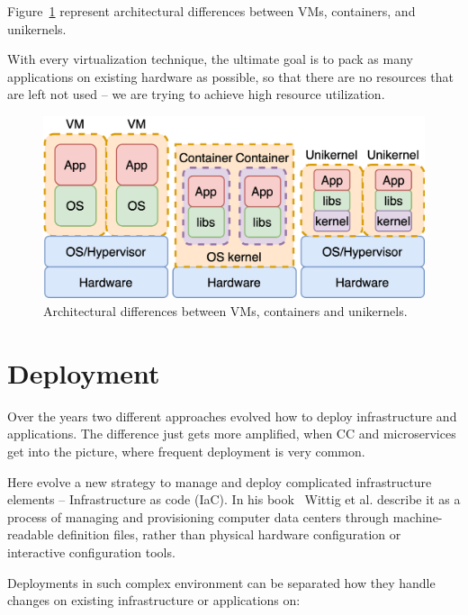 Figure~\ref{fig:fig5} represent architectural differences between VMs, containers, and unikernels.

With every virtualization technique, the ultimate goal is to pack as many applications on existing hardware as possible, so that there are no resources that are left not used -- we are trying to achieve high resource utilization.

\begin{figure}[H]
	\begin{center}
		\includegraphics[scale=0.9]{images/Figure5.png}
	\end{center}
	\vspace{-0.6cm}
	\caption{Architectural differences between VMs, containers and unikernels.}
	\label{fig:fig5}
\end{figure}
%
%
\section{Deployment}\label{sec:deployment}
%
Over the years two different approaches evolved how to deploy infrastructure and applications. The difference just gets more amplified, when CC and microservices get into the picture, where frequent deployment is very common. 

Here evolve a new strategy to manage and deploy complicated infrastructure elements -- Infrastructure as code (IaC). In his book~\cite{wittig2018amazon} Wittig et al. describe it as a process of managing and provisioning computer data centers through machine-readable definition files, rather than physical hardware configuration or interactive configuration tools.

Deployments in such complex environment can be separated how they handle changes on existing infrastructure or applications on:

